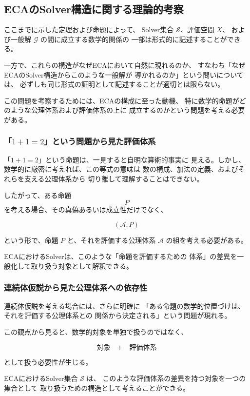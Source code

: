 \subsection{ECAのSolver構造に関する理論的考察}

ここまでに示した定理および命題によって、
Solver集合 $\mathcal{S}$、評価空間 $X$、
および一般解 $\mathcal{G}$ の間に成立する数学的関係の
一部は形式的に記述することができる。

一方で、これらの構造がなぜECAにおいて自然に現れるのか、
すなわち「なぜECAのSolver構造からこのような一般解が
導かれるのか」という問いについては、
必ずしも同じ形式の証明として記述することが適切とは限らない。

この問題を考察するためには、ECAの構成に至った動機、
特に数学的命題がどのような公理体系および評価体系の上に
成立するのかという問題を考える必要がある。

\subsubsection{「$1+1=2$」という問題から見た評価体系}

「$1+1=2$」という命題は、一見すると自明な算術的事実に
見える。しかし、数学的に厳密に考えれば、この等式の意味は
数の構成、加法の定義、およびそれらを支える公理体系から
切り離して理解することはできない。

したがって、ある命題
\[
P
\]
を考える場合、その真偽あるいは成立性だけでなく、

\[
(\mathcal{A},P)
\]

という形で、命題 $P$ と、それを評価する公理体系
$\mathcal{A}$ の組を考える必要がある。

ECAにおけるSolverは、このような「命題を評価するための
体系」の差異を一般化して取り扱う対象として解釈できる。

\subsubsection{連続体仮説から見た公理体系への依存性}

連続体仮説を考える場合には、さらに明確に
「ある命題の数学的位置づけは、それを評価する公理体系との
関係から決定される」という問題が現れる。

この観点から見ると、数学的対象を単独で扱うのではなく、

\[
\text{対象}
\quad+\quad
\text{評価体系}
\]

として扱う必要性が生じる。

ECAにおけるSolver集合 $\mathcal{S}$ は、
このような評価体系の差異を持つ対象を一つの集合として
取り扱うための構造として考えることができる。

